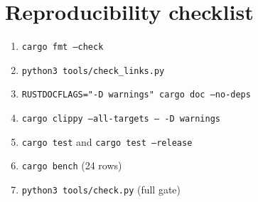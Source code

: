 \documentclass[11pt,a4paper]{article}
\begin{document}
\section{Reproducibility checklist}

\begin{enumerate}[leftmargin=1.3em]
\item \texttt{cargo fmt --check}
\item \texttt{python3 tools/check\_links.py}
\item \texttt{RUSTDOCFLAGS="-D warnings" cargo doc --no-deps}
\item \texttt{cargo clippy --all-targets -- -D warnings}
\item \texttt{cargo test} and \texttt{cargo test --release}
\item \texttt{cargo bench} (24 rows)
\item \texttt{python3 tools/check.py} (full gate)
\end{enumerate}
\end{document}
